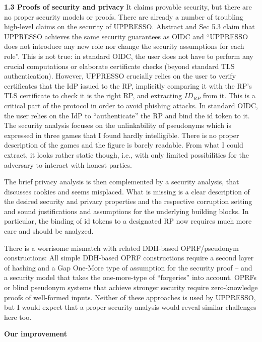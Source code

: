 \documentclass[letterpaper,onecolumn,10pt]{article}
\begin{document}
\vspace{1mm}\noindent\textbf{1.3 Proofs of security and privacy}
It claims provable security, but there are no proper security models or proofs.
There are already a number of troubling high-level claims on the security of UPPRESSO.
Abstract and Sec 5.3 claim that UPPRESSO achieves the same security guarantees as OIDC and ``UPPRESSO does not introduce any new role nor change the security assumptions for each role''.
This is not true: in standard OIDC, the user does not have to perform any crucial computations or elaborate certificate checks (beyond standard TLS authentication).
However, UPPRESSO crucially relies on the user to verify certificates that the IdP issued to the RP, implicitly comparing it with the RP's TLS certificate to check it is the right RP, and extracting $ID_{RP}$ from it.
This is a critical part of the protocol in order to avoid phishing attacks. In standard OIDC, the user relies on the IdP to ``authenticate'' the RP and bind the id token to it.
The security analysis focuses on the unlinkability of pseudonyms which is expressed in three games that I found hardly intelligible.
There is no proper description of the games and the figure is barely readable.
From what I could extract, it looks rather static though, i.e., with only limited possibilities for the adversary to interact with honest parties.

The brief privacy analysis is then complemented by a security analysis, that discusses cookies and seems misplaced.
What is missing is a clear description of the desired security and privacy properties and the respective corruption setting and sound justifications and assumptions for the underlying building blocks. In particular, the binding of id tokens to a designated RP now requires much more care and should be analyzed.

There is a worrisome mismatch with related DDH-based OPRF/pseudonym constructions:
All simple DDH-based OPRF constructions require a second layer of hashing and a Gap One-More type of assumption for the security proof -- and a security model that takes the one-more-type of ``forgeries'' into account.
OPRFs or blind pseudonym systems that achieve stronger security require zero-knowledge proofs of well-formed inputs. Neither of these approaches is used by UPPRESSO, but I would expect that a proper security analysis would reveal similar challenges here too.



\vspace{1mm}\noindent\textbf{Our improvement}
\end{document}
